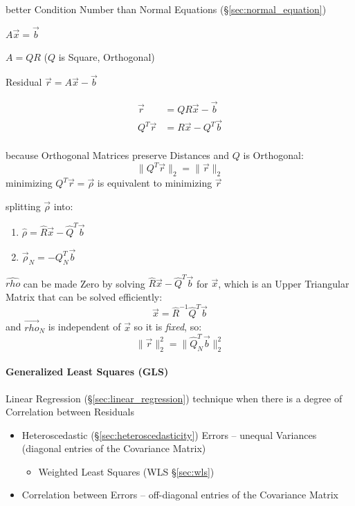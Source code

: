 better Condition Number than Normal Equations (\S\ref{sec:normal_equation})

$A\vec{x} = \vec{b}$

$A = QR$ ($Q$ is Square, Orthogonal)

Residual $\vec{r} = A\vec{x} - \vec{b}$

\begin{align*}
     \vec{r} & = QR\vec{x} - \vec{b} \\
  Q^T\vec{r} & = R\vec{x} - Q^T\vec{b} \\
\end{align*}

because Orthogonal Matrices preserve Distances and $Q$ is Orthogonal:
\[
  \|Q^T\vec{r}\|_2 = \|\vec{r}\|_2
\]
minimizing $Q^T\vec{r} = \vec{\rho}$ is equivalent to minimizing $\vec{r}$

splitting $\vec{\rho}$ into:
\begin{enumerate}
  \item $\hat{\rho}   = \hat{R}\vec{x} - \hat{Q}^T\vec{b}$
  \item $\vec{\rho}_N = -Q_N^T\vec{b}$
\end{enumerate}
$\hat{rho}$ can be made Zero by solving $\hat{R}\vec{x} - \hat{Q}^T\vec{b}$ for
$\vec{x}$, which is an Upper Triangular Matrix that can be solved efficiently:
\[
  \hat{\vec{x}} = \hat{R}^{-1}\hat{Q}^T\vec{b}
\]
and $\vec{rho}_N$ is independent of $\vec{x}$ so it is \emph{fixed}, so:
\[
  \|\vec{r}\|^2_2 = \|\hat{Q}_N^T\vec{b}\|_2^2
\]



\paragraph{Generalized Least Squares (GLS)}\label{sec:gls}\hfill

Linear Regression (\S\ref{sec:linear_regression}) technique when there is a
degree of Correlation between Residuals

\begin{itemize}
  \item Heteroscedastic (\S\ref{sec:heteroscedasticity}) Errors -- unequal
    Variances (diagonal entries of the Covariance Matrix)
    \begin{itemize}
      \item Weighted Least Squares (WLS \S\ref{sec:wls})
    \end{itemize}
  \item Correlation between Errors -- off-diagonal entries of the Covariance
    Matrix
\end{itemize}

